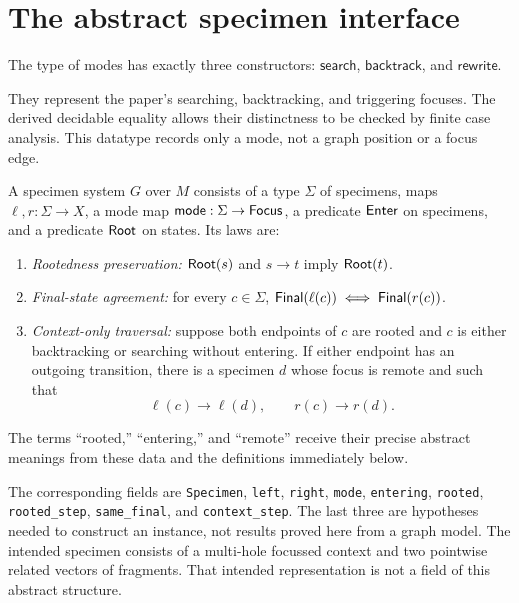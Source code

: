 \section{The abstract specimen interface}

\begin{definition}\label{term:focus}
The type of modes has exactly three constructors:
$\mathsf{search}$, $\mathsf{backtrack}$, and $\mathsf{rewrite}$.
\end{definition}
They represent the paper's searching, backtracking, and triggering focuses.
The derived decidable equality allows their distinctness to be checked by
finite case analysis. This datatype records only a mode, not a graph
position or a focus edge.

\begin{definition}\label{term:specimen}\label{def:specimen}
A specimen system $G$ over $M$ consists of a type $\Sigma$ of specimens,
maps $\ell,r:\Sigma\to X$, a mode map
$\mathsf{mode}:\Sigma\to\mathsf{Focus}$, a predicate $\mathsf{Enter}$ on specimens,
and a predicate $\mathsf{Root}$ on states. Its laws are:
\begin{enumerate}
\item \emph{Rootedness preservation:} $\mathsf{Root}(s)$ and $s\to t$ imply $\mathsf{Root}(t)$.
\item \emph{Final-state agreement:} for every $c\in\Sigma$,
  $\mathsf{Final}(\ell(c))\iff\mathsf{Final}(r(c))$.
\item \emph{Context-only traversal:} suppose both endpoints of $c$ are
  rooted and $c$ is either backtracking or searching without entering.
  If either endpoint has an outgoing transition, there is a specimen $d$
  whose focus is remote and such that
  \[
    \ell(c)\to\ell(d),\qquad r(c)\to r(d).
  \]
\end{enumerate}
The terms ``rooted,'' ``entering,'' and ``remote'' receive their precise
abstract meanings from these data and the definitions immediately below.
\end{definition}
The corresponding fields are \texttt{Specimen}, \texttt{left},
\texttt{right}, \texttt{mode}, \texttt{entering}, \texttt{rooted},
\texttt{rooted\_step}, \texttt{same\_final}, and \texttt{context\_step}.
The last three are hypotheses needed to construct an instance, not results
proved here from a graph model. The intended specimen consists of a
multi-hole focussed context and two pointwise related vectors of fragments.
That intended representation is not a field of this abstract structure.


